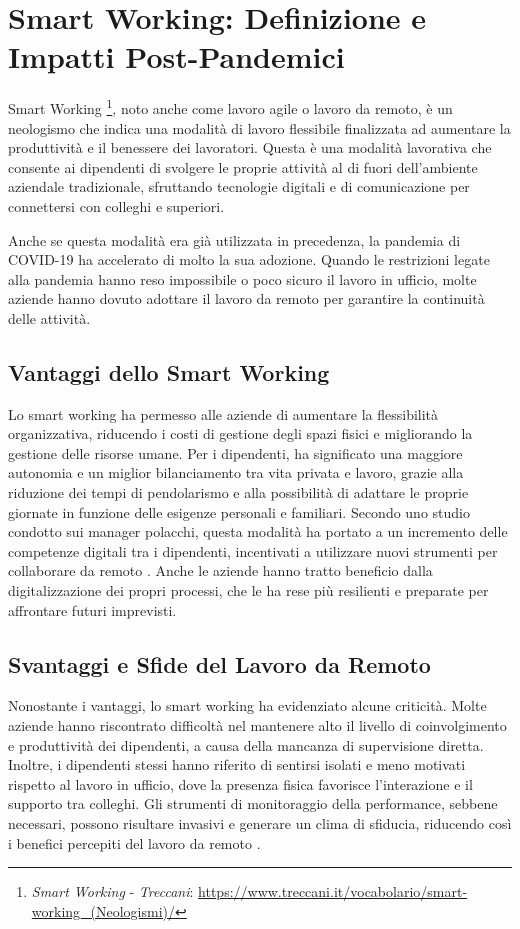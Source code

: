 \documentclass[12pt,a4paper,openright,twoside]{book}
\begin{document}
\section{Smart Working: Definizione e Impatti Post-Pandemici}

Smart Working \footnote{\emph{Smart Working} - \emph{Treccani}: \url{https://www.treccani.it/vocabolario/smart-working_(Neologismi)/}}, noto anche come lavoro agile o lavoro da remoto, è un neologismo che indica una modalità di lavoro flessibile finalizzata ad aumentare la produttività e il benessere dei lavoratori. Questa è una modalità lavorativa che consente ai dipendenti di svolgere le proprie attività al di fuori dell’ambiente aziendale tradizionale, sfruttando tecnologie digitali e di comunicazione per connettersi con colleghi e superiori.

Anche se questa modalità era già utilizzata in precedenza, la pandemia di COVID-19 ha accelerato di molto la sua adozione. Quando le restrizioni legate alla pandemia hanno reso impossibile o poco sicuro il lavoro in ufficio, molte aziende hanno dovuto adottare il lavoro da remoto per garantire la continuità delle attività\cite{urbaniec2022}.

\subsection{Vantaggi dello Smart Working}
Lo smart working ha permesso alle aziende di aumentare la flessibilità organizzativa, riducendo i costi di gestione degli spazi fisici e migliorando la gestione delle risorse umane. Per i dipendenti, ha significato una maggiore autonomia e un miglior bilanciamento tra vita privata e lavoro, grazie alla riduzione dei tempi di pendolarismo e alla possibilità di adattare le proprie giornate in funzione delle esigenze personali e familiari. Secondo uno studio condotto sui manager polacchi, questa modalità ha portato a un incremento delle competenze digitali tra i dipendenti, incentivati a utilizzare nuovi strumenti per collaborare da remoto \cite{urbaniec2022}. Anche le aziende hanno tratto beneficio dalla digitalizzazione dei propri processi, che le ha rese più resilienti e preparate per affrontare futuri imprevisti.

\subsection{Svantaggi e Sfide del Lavoro da Remoto}
Nonostante i vantaggi, lo smart working ha evidenziato alcune criticità. Molte aziende hanno riscontrato difficoltà nel mantenere alto il livello di coinvolgimento e produttività dei dipendenti, a causa della mancanza di supervisione diretta. Inoltre, i dipendenti stessi hanno riferito di sentirsi isolati e meno motivati rispetto al lavoro in ufficio, dove la presenza fisica favorisce l’interazione e il supporto tra colleghi. Gli strumenti di monitoraggio della performance, sebbene necessari, possono risultare invasivi e generare un clima di sfiducia, riducendo così i benefici percepiti del lavoro da remoto \cite{urbaniec2022}.
\end{document}
